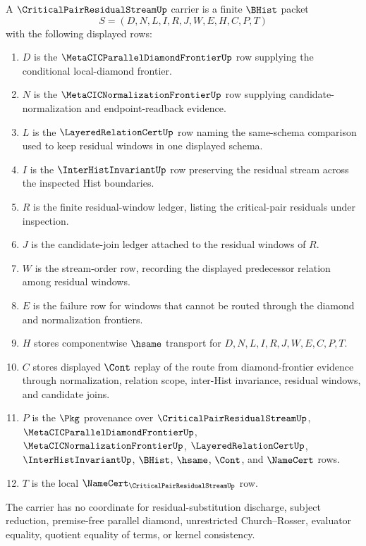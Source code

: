 \begin{definition}
\label{def:critical-pair-residual-stream-carrier}
A $\CriticalPairResidualStreamUp$ carrier is a finite $\BHist$ packet
$$
S=(D,N,L,I,R,J,W,E,H,C,P,T)
$$
with the following displayed rows:
\begin{enumerate}
\item $D$ is the $\MetaCICParallelDiamondFrontierUp$ row supplying the conditional local-diamond frontier.
\item $N$ is the $\MetaCICNormalizationFrontierUp$ row supplying candidate-normalization and endpoint-readback evidence.
\item $L$ is the $\LayeredRelationCertUp$ row naming the same-schema comparison used to keep residual windows in one displayed schema.
\item $I$ is the $\InterHistInvariantUp$ row preserving the residual stream across the inspected Hist boundaries.
\item $R$ is the finite residual-window ledger, listing the critical-pair residuals under inspection.
\item $J$ is the candidate-join ledger attached to the residual windows of $R$.
\item $W$ is the stream-order row, recording the displayed predecessor relation among residual windows.
\item $E$ is the failure row for windows that cannot be routed through the diamond and normalization frontiers.
\item $H$ stores componentwise $\hsame$ transport for $D,N,L,I,R,J,W,E,C,P,T$.
\item $C$ stores displayed $\Cont$ replay of the route from diamond-frontier evidence through normalization, relation scope, inter-Hist invariance, residual windows, and candidate joins.
\item $P$ is the $\Pkg$ provenance over $\CriticalPairResidualStreamUp$, $\MetaCICParallelDiamondFrontierUp$, $\MetaCICNormalizationFrontierUp$, $\LayeredRelationCertUp$, $\InterHistInvariantUp$, $\BHist$, $\hsame$, $\Cont$, and $\NameCert$ rows.
\item $T$ is the local $\NameCert_{\CriticalPairResidualStreamUp}$ row.
\end{enumerate}
The carrier has no coordinate for residual-substitution discharge, subject reduction, premise-free parallel diamond, unrestricted Church--Rosser, evaluator equality, quotient equality of terms, or kernel consistency.
\end{definition}

